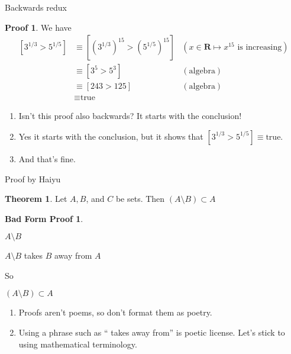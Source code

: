\documentclass[fleqn]{beamer}
\newcommand{\reals}{\mathbf{R}}
\theoremstyle{definition}
\newtheorem{myth}{Theorem}
\newtheorem{myproof}{Proof}
\newtheorem{mybadformproof}{Bad Form Proof}
\begin{document}
\begin{frame}{Backwards redux}


\begin{myproof}
We have
\begin{align*}
   \left[   3^{1/3} > 5^{1/5} \right]  &\equiv \left[   (3^{1/3})^{15} > (5^{1/5})^{15}  \right]    & ( x \in \reals \mapsto x^{15} \mbox{ is  increasing}) \\
                                                               &\equiv  \left[ 3^5> 5^3 \right]   &(\mbox{algebra}) \\
                                                                   &\equiv  \left[ 243 > 125 \right]   &(\mbox{algebra}) \\
                                                                   &\equiv  \mbox{true}
  \end{align*}
\end{myproof}
\begin{enumerate}

\item Isn't this proof also backwards? It starts with the conclusion!

\item Yes it starts with the conclusion, but it shows that   \(    \left[   3^{1/3} > 5^{1/5} \right]    \equiv  \mbox{true} \).

\item And that's fine.
\end{enumerate}
\end{frame}

\begin{frame}{Proof by Haiyu}

\begin{myth}  Let \(A,B\), and \(C\) be sets.  Then \( \left (A \setminus B \right ) \subset A\)  \end{myth}

\begin{mybadformproof}
   \begin{center}  \( A \setminus B \) \end{center}

     \begin{center}  \( A \setminus B \)  takes $B$ away from \(A\) \end{center}

     \begin{center}  So   \end{center}

     \begin{center}    \(\left(A \setminus B \right) \subset A\)  \end{center}

\end{mybadformproof}

\begin{enumerate}

\item Proofs aren't poems, so don't format them as poetry.

\item Using a phrase such as `` takes away from'' is poetic license.  Let's stick to using mathematical terminology.
\end{enumerate}
\end{frame}
\end{document}
